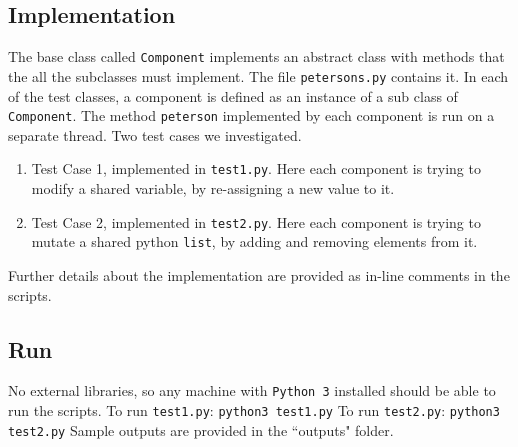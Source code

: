 \documentclass[18pt]{extarticle}
\begin{document}
\subsection*{Implementation} 
The base class called \texttt{Component} implements an abstract class with methods that the all the subclasses must implement. The file \texttt{petersons.py} contains it. In each of the test classes, a component is defined as an instance of a sub class of \texttt{Component}. The method \texttt{peterson} implemented by each component is run on a separate thread. \newline
 Two test cases we investigated. 
\begin{enumerate}
 \item Test Case 1, implemented in \texttt{test1.py}. Here each component is trying to modify a shared variable, by re-assigning a new value to it. 
 \item Test Case 2, implemented in \texttt{test2.py}. Here each component is trying to mutate a shared python \texttt{list}, by adding and removing elements from it. 
 \end{enumerate}
 
 Further details about the implementation are provided as in-line comments in the scripts.

\subsection*{Run}
No external libraries, so any machine with \texttt{Python 3} installed should be able to run the scripts.  \newline
To run \texttt{test1.py}: \texttt{python3 test1.py} \newline
To run \texttt{test2.py}: \texttt{python3 test2.py} \newline
Sample outputs are provided in the ``outputs" folder.


\newpage
\end{document}

